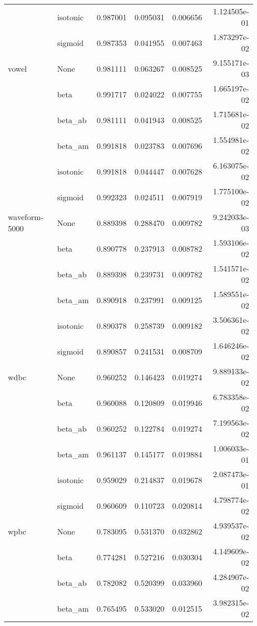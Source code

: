 \begin{tabular}{llrrrr}
        & isotonic &  0.987001 &  0.095031 &  0.006656 &  1.124505e-01 \\
        & sigmoid &  0.987353 &  0.041955 &  0.007463 &  1.873297e-02 \\
vowel & None &  0.981111 &  0.063267 &  0.008525 &  9.155171e-03 \\
        & beta &  0.991717 &  0.024022 &  0.007755 &  1.665197e-02 \\
        & beta\_ab &  0.981111 &  0.041943 &  0.008525 &  1.715681e-02 \\
        & beta\_am &  0.991818 &  0.023783 &  0.007696 &  1.554981e-02 \\
        & isotonic &  0.991818 &  0.044447 &  0.007628 &  6.163075e-02 \\
        & sigmoid &  0.992323 &  0.024511 &  0.007919 &  1.775100e-02 \\
waveform-5000 & None &  0.889398 &  0.288470 &  0.009782 &  9.242033e-03 \\
        & beta &  0.890778 &  0.237913 &  0.008782 &  1.593106e-02 \\
        & beta\_ab &  0.889398 &  0.239731 &  0.009782 &  1.541571e-02 \\
        & beta\_am &  0.890918 &  0.237991 &  0.009125 &  1.589551e-02 \\
        & isotonic &  0.890378 &  0.258739 &  0.009182 &  3.506361e-02 \\
        & sigmoid &  0.890857 &  0.241531 &  0.008709 &  1.646246e-02 \\
wdbc & None &  0.960252 &  0.146423 &  0.019274 &  9.889133e-02 \\
        & beta &  0.960088 &  0.120809 &  0.019946 &  6.783358e-02 \\
        & beta\_ab &  0.960252 &  0.122784 &  0.019274 &  7.199563e-02 \\
        & beta\_am &  0.961137 &  0.145177 &  0.019884 &  1.006033e-01 \\
        & isotonic &  0.959029 &  0.214837 &  0.019678 &  2.087473e-01 \\
        & sigmoid &  0.960609 &  0.110723 &  0.020814 &  4.798774e-02 \\
wpbc & None &  0.783095 &  0.531370 &  0.032862 &  4.939537e-02 \\
        & beta &  0.774281 &  0.527216 &  0.030304 &  4.149609e-02 \\
        & beta\_ab &  0.782082 &  0.520399 &  0.033960 &  4.284907e-02 \\
        & beta\_am &  0.765495 &  0.533020 &  0.012515 &  3.982315e-02 \\

\end{tabular}
